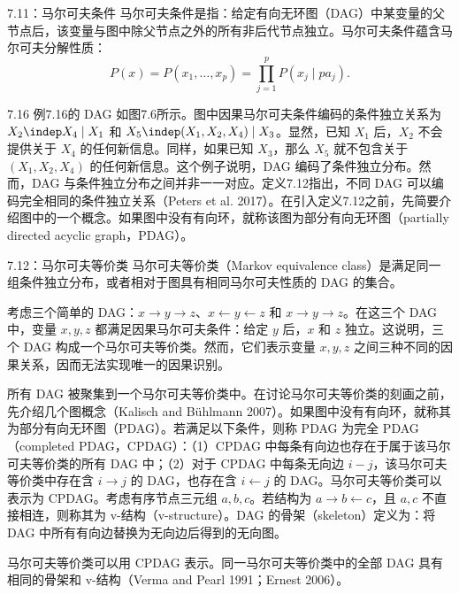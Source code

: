 \begin{bookdefinition}{7.11：马尔可夫条件}
马尔可夫条件是指：给定有向无环图（DAG）中某变量的父节点后，该变量与图中除父节点之外的所有非后代节点独立。马尔可夫条件蕴含马尔可夫分解性质：
\begin{equation}
P(x)=P(x_1,\ldots,x_p)=\prod_{j=1}^{p}P(x_j\mid pa_j).
\tag{7.196}
\end{equation}
\end{bookdefinition}

\begin{bookexample}{7.16}
例7.16的 DAG 如图7.6所示。图中因果马尔可夫条件编码的条件独立关系为 $X_2\indep X_4\mid X_1$ 和 $X_5\indep(X_1,X_2,X_4)\mid X_3$。显然，已知 $X_1$ 后，$X_2$ 不会提供关于 $X_4$ 的任何新信息。同样，如果已知 $X_3$，那么 $X_5$ 就不包含关于 $(X_1,X_2,X_4)$ 的任何新信息。这个例子说明，DAG 编码了条件独立分布。然而，DAG 与条件独立分布之间并非一一对应。定义7.12指出，不同 DAG 可以编码完全相同的条件独立关系（Peters et al. 2017）。在引入定义7.12之前，先简要介绍图中的一个概念。如果图中没有有向环，就称该图为部分有向无环图（partially directed acyclic graph，PDAG）。
\end{bookexample}


\begin{bookdefinition}{7.12：马尔可夫等价类}
马尔可夫等价类（Markov equivalence class）是满足同一组条件独立分布，或者相对于图具有相同马尔可夫性质的 DAG 的集合。
\end{bookdefinition}

考虑三个简单的 DAG：$x\to y\to z$、$x\leftarrow y\leftarrow z$ 和 $x\to y\to z$。在这三个 DAG 中，变量 $x,y,z$ 都满足因果马尔可夫条件：给定 $y$ 后，$x$ 和 $z$ 独立。这说明，三个 DAG 构成一个马尔可夫等价类。然而，它们表示变量 $x,y,z$ 之间三种不同的因果关系，因而无法实现唯一的因果识别。

所有 DAG 被聚集到一个马尔可夫等价类中。在讨论马尔可夫等价类的刻画之前，先介绍几个图概念（Kalisch and Bühlmann 2007）。如果图中没有有向环，就称其为部分有向无环图（PDAG）。若满足以下条件，则称 PDAG 为完全 PDAG（completed PDAG，CPDAG）：（1）CPDAG 中每条有向边也存在于属于该马尔可夫等价类的所有 DAG 中；（2）对于 CPDAG 中每条无向边 $i-j$，该马尔可夫等价类中存在含 $i\to j$ 的 DAG，也存在含 $i\leftarrow j$ 的 DAG。马尔可夫等价类可以表示为 CPDAG。考虑有序节点三元组 $a,b,c$。若结构为 $a\to b\leftarrow c$，且 $a,c$ 不直接相连，则称其为 v-结构（v-structure）。DAG 的骨架（skeleton）定义为：将 DAG 中所有有向边替换为无向边后得到的无向图。

马尔可夫等价类可以用 CPDAG 表示。同一马尔可夫等价类中的全部 DAG 具有相同的骨架和 v-结构（Verma and Pearl 1991；Ernest 2006）。

